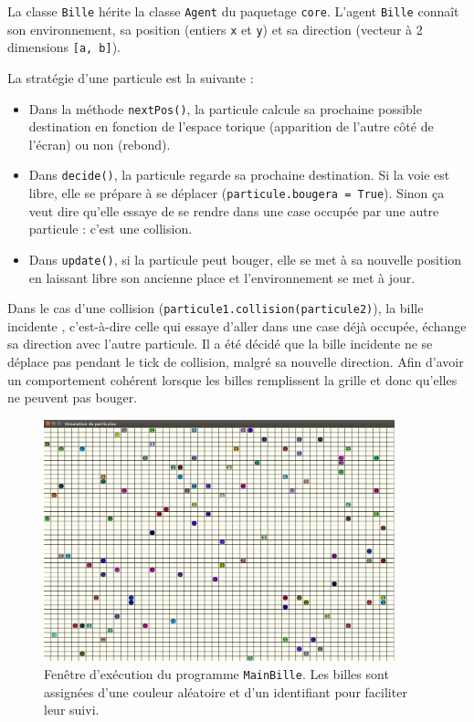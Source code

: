 \documentclass[a4paper]{article}
\begin{document}
\medskip
La classe \texttt{Bille} hérite la classe \texttt{Agent} du paquetage \texttt{core}. L'agent \texttt{Bille} connaît son environnement, sa position (entiers \texttt{x} et \texttt{y}) et sa direction (vecteur à 2 dimensions \texttt{[a, b]}).

\medskip
La stratégie d'une particule est la suivante :
\begin{itemize}
\item Dans la méthode \texttt{nextPos()}, la particule calcule sa prochaine possible destination en fonction de l'espace torique (apparition de \og l'autre côté \fg{} de l'écran) ou non (rebond).
\item Dans \texttt{decide()}, la particule regarde sa prochaine destination. Si la voie est libre, elle se prépare à se déplacer (\texttt{particule.bougera = True}). Sinon ça veut dire qu'elle essaye de se rendre dans une case occupée par une autre particule : c'est une collision.
\item Dans \texttt{update()}, si la particule peut bouger, elle se met à sa nouvelle position en laissant libre son ancienne place et l'environnement se met à jour.
\end{itemize}

\medskip
Dans le cas d'une collision (\texttt{particule1.collision(particule2)}), la bille \og incidente \fg{}, c'est-à-dire celle qui essaye d'aller dans une case déjà occupée, échange sa direction avec l'autre particule. Il a été décidé que la bille incidente ne se déplace pas pendant le tick de collision, malgré sa nouvelle direction. Afin d'avoir un comportement cohérent lorsque les billes remplissent la grille et donc qu'elles ne peuvent pas bouger.
 
\begin{figure}[!h]
\centering
\includegraphics[height=7cm]{particules.png}
\caption{Fenêtre d'exécution du programme \texttt{MainBille}. Les billes sont assignées d'une couleur aléatoire et d'un identifiant pour faciliter leur suivi.}
\end{figure}
\end{document}
